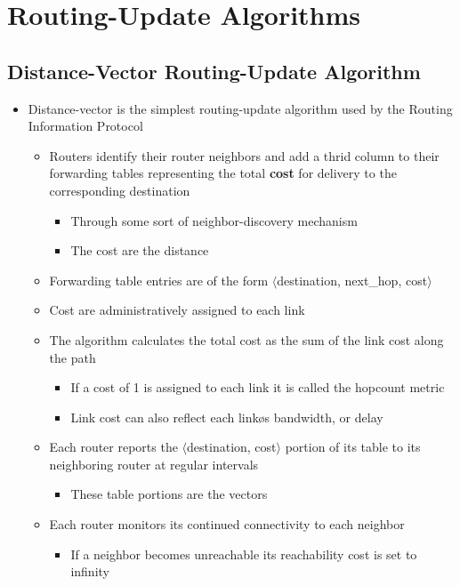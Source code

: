 \documentclass[11pt]{article}
\providecommand{\tightlist}{%
      \setlength{\itemsep}{0pt}\setlength{\parskip}{0pt}}
\begin{document}
    \section{Routing-Update Algorithms}\label{routing-update-algorithms}

    \subsection{Distance-Vector Routing-Update
Algorithm}\label{distance-vector-routing-update-algorithm}

\begin{itemize}
\tightlist
\item
  Distance-vector is the simplest routing-update algorithm used by the
  Routing Information Protocol

  \begin{itemize}
  \tightlist
  \item
    Routers identify their router neighbors and add a thrid column to
    their forwarding tables representing the total \textbf{cost} for
    delivery to the corresponding destination

    \begin{itemize}
    \tightlist
    \item
      Through some sort of neighbor-discovery mechanism
    \item
      The cost are the distance
    \end{itemize}
  \item
    Forwarding table entries are of the form \(\langle\)destination,
    next\_hop, cost\(\rangle\)
  \item
    Cost are administratively assigned to each link
  \item
    The algorithm calculates the total cost as the sum of the link cost
    along the path

    \begin{itemize}
    \tightlist
    \item
      If a cost of 1 is assigned to each link it is called the hopcount
      metric
    \item
      Link cost can also reflect each linkøs bandwidth, or delay
    \end{itemize}
  \item
    Each router reports the \(\langle\)destination, cost\(\rangle\)
    portion of its table to its neighboring router at regular intervals

    \begin{itemize}
    \tightlist
    \item
      These table portions are the vectors
    \end{itemize}
  \item
    Each router monitors its continued connectivity to each neighbor

    \begin{itemize}
    \tightlist
    \item
      If a neighbor becomes unreachable its reachability cost is set to
      infinity
    \end{itemize}
  \end{itemize}
\end{itemize}
\end{document}
